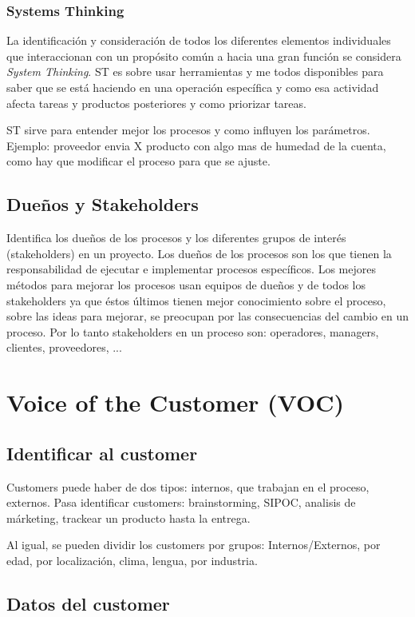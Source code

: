 \documentclass[]{article}
\begin{document}
\subsubsection{Systems Thinking}

La identificación y consideración de todos los diferentes elementos individuales que interaccionan con un propósito común a hacia una gran función se considera \textit{System Thinking}. ST es sobre usar herramientas y me todos disponibles para saber que se está haciendo en una operación específica y como esa actividad afecta tareas y productos posteriores y como priorizar tareas.

ST sirve para entender mejor los procesos y como influyen los parámetros. Ejemplo: proveedor envia X producto con algo mas de humedad de la cuenta, como hay que modificar el proceso para que se ajuste. 

\subsection{Dueños y Stakeholders}

Identifica los dueños de los procesos y los diferentes grupos de interés (stakeholders) en un proyecto.
Los dueños de los procesos son los que tienen la responsabilidad de ejecutar e implementar procesos específicos. Los mejores métodos para mejorar los procesos usan equipos de dueños y de todos los stakeholders ya que éstos últimos tienen mejor conocimiento sobre el proceso, sobre las ideas para mejorar, se preocupan por las consecuencias del cambio en un proceso. Por lo tanto stakeholders en un proceso son: operadores, managers, clientes, proveedores, ...

\section{Voice of the Customer (VOC)}

\subsection{Identificar al customer}
Customers puede haber de dos tipos: internos, que trabajan en el proceso, externos. Pasa identificar customers: brainstorming, SIPOC, analisis de márketing, trackear un producto hasta la entrega.

Al igual, se pueden dividir los customers por grupos: Internos/Externos, por edad, por localización, clima, lengua, por industria.

\subsection{Datos del customer}
\end{document}
